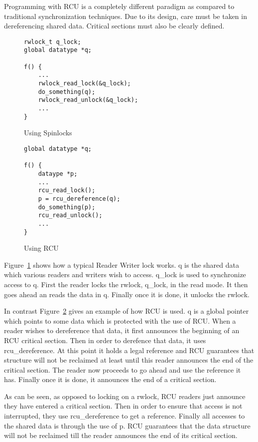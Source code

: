 Programming with RCU is a completely different paradigm as compared to traditional
synchronization techniques. Due to its design, care must be taken in dereferencing
shared data. Critical sections must also be clearly defined.


\begin{figure}[h]
\centering
\begin{lstlisting}
rwlock_t q_lock;
global datatype *q;

f() {
	...
	rwlock_read_lock(&q_lock);
	do_something(q);
	rwlock_read_unlock(&q_lock);
	...
}
\end{lstlisting}
\caption{Using Spinlocks}\label{fig:rwuse}
\end{figure}

\begin{figure}[h]
\centering
\begin{lstlisting}
global datatype *q;

f() {
	dataype *p;
	...
	rcu_read_lock();
	p = rcu_dereference(q);
	do_something(p);
	rcu_read_unlock();
	...
}
\end{lstlisting}
\caption{Using RCU}\label{fig:RCUuse}
\end{figure}

Figure~\ref{fig:rwuse} shows how a
typical Reader Writer lock works. q is the shared data which various readers
and writers wish to access. q\_lock is used to synchronize access to q.
First the reader locks the rwlock, q\_lock,
in the read mode. It then goes ahead an reads the data in q. Finally once it is
done, it unlocks the rwlock.

In contrast Figure~\ref{fig:RCUuse} gives an example of how RCU is used. q is a global pointer
which points to some data which is protected with the use of RCU. When a reader
wishes to dereference that data, it first announces the beginning of an RCU critical
section. Then in order to derefence that data, it uses rcu\_dereference. At this
point it holds a legal reference and RCU guarantees that structure will not be
reclaimed at least until this reader announces the end of the critical section.
The reader now proceeds to go ahead and use the reference it has. Finally once it
is done, it announces the end of a critical section.

As can be seen, as opposed to locking on a rwlock, RCU readers just announce they
have entered a critical section. Then in order to ensure that access is not
interrupted, they use rcu\_dereference to get a reference. Finally all accesses
to the shared data is through the use of p. RCU guarantees that the data structure
will not be reclaimed till the reader announces the end of its critical section.

